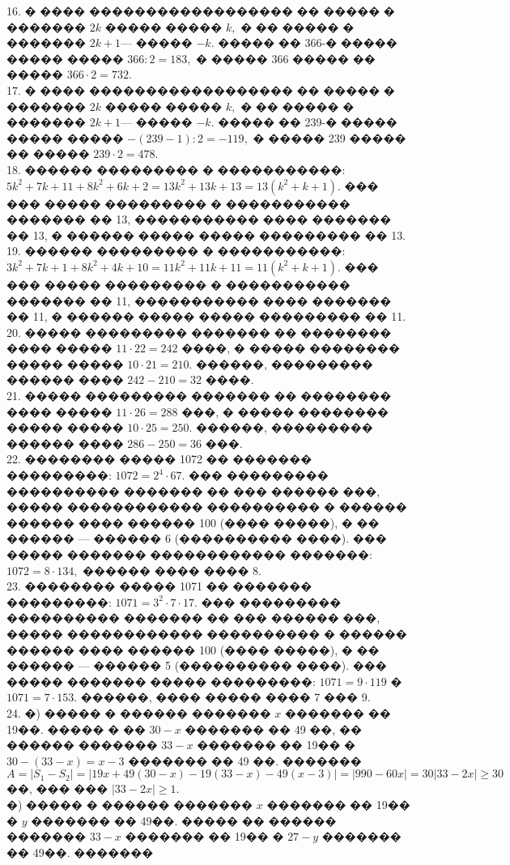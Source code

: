 \documentclass[12pt]{article}
\begin{document}
16. � ���� ������������������ �� ����� � ������� $2k$ ����� ����� $k,$ � �� ����� � ������� $2k+1$--- ����� $-k.$ ����� �� 366-� ����� ����� ����� $366:2=183,$ � ����� 366 ����� �� ����� $366\cdot2=732.$\\
17. � ���� ������������������ �� ����� � ������� $2k$ ����� ����� $k,$ � �� ����� � ������� $2k+1$--- ����� $-k.$ ����� �� 239-� ����� ����� ����� $-(239-1):2=-119,$ � ����� 239 ����� �� ����� $239\cdot2=478.$\\
18. ������ ��������� � �����������: $5k^2+7k+11+8k^2+6k+2=13k^2+13k+13=13(k^2+k+1).$ ��� ��� ����� ��������� � ����������� ������� �� 13, ����������� ���� ������� �� 13, � ������ ����� ����� ��������� �� 13.\\
19. ������ ��������� � �����������: $3k^2+7k+1+8k^2+4k+10=11k^2+11k+11=11(k^2+k+1).$ ��� ��� ����� ��������� � ����������� ������� �� 11, ����������� ���� ������� �� 11, � ������ ����� ����� ��������� �� 11.\\
20. ����� ��������� ������� �� �������� ���� ����� $11\cdot22=242$ ����, � ����� �������� ����� ����� $10\cdot21=210.$ ������, ��������� ������ ���� $242-210=32$ ����.\\
21. ����� ��������� ������� �� �������� ���� ����� $11\cdot26=288$ ���, � ����� �������� ����� ����� $10\cdot25=250.$ ������, ��������� ������ ���� $286-250=36$ ���.\\
22. �������� ����� 1072 �� ������� ���������: $1072=2^4\cdot67.$ ��� ��������� ���������� ������� �� ��� ������ ���, ����� ������������ ���������� � ������ ������ ���� ������ 100 (���� �����), � �� ������ --- ������ 6 (���������� ����). ��� ����� ������� ������������ �������: $1072=8\cdot134,$ ������ ���� ���� 8.\\
23. �������� ����� 1071 �� ������� ���������: $1071=3^2\cdot7\cdot17.$ ��� ��������� ���������� ������� �� ��� ������ ���, ����� ������������ ���������� � ������ ������ ���� ������ 100 (���� �����), � �� ������ --- ������ 5 (���������� ����). ��� ����� ������� ����� ���������: $1071=9\cdot119$ � $1071=7\cdot153.$ ������, ���� ����� ���� 7 ��� 9.\\
24. �) ����� � ������ ������� $x$ ������� �� 19��. ����� � �� $30-x$ ������� �� 49 ��, �� ������ ������� $33-x$ ������� �� 19�� � $30-(33-x)=x-3$ ������� �� 49 ��.
������� $A=|S_1-S_2|=|19x+49(30-x)-19(33-x)-49(x-3)|=|990-60x|=30|33-2x|\geqslant30$��, ��� ��� $|33-2x|\geqslant1.$\\
�) ����� � ������ ������� $x$ ������� �� 19�� � $y$ ������� �� 49��. ����� �� ������ ������� $33-x$ ������� �� 19�� � $27-y$ ������� �� 49��. �������
\end{document}
